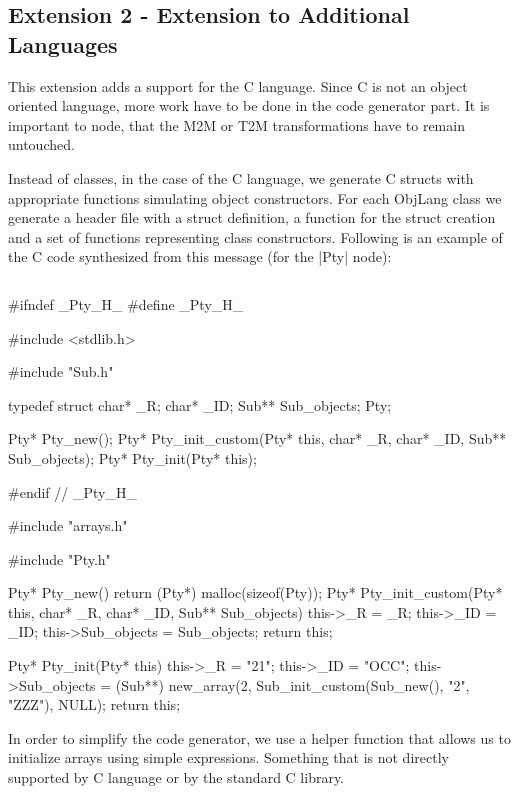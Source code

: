 \subsection{Extension 2 - Extension to Additional Languages}
\label{sec:Extension2}

This extension adds a support for the C language.
Since C is not an object oriented language, more work have to be done in the code generator part.
It is important to node, that the M2M or T2M transformations have to remain untouched.

Instead of classes, in the case of the C language, we generate C structs with appropriate functions simulating object constructors.
For each ObjLang class we generate a header file with a struct definition, a function for the struct creation and a set of functions representing class constructors.
Following is an example of the C code synthesized from this \FIXML message (for the \Scala|Pty| node):
%
\inputminted[fontsize=\fontsize{8}{8},linenos,numbersep=5pt,frame=lines,framesep=2mm]{xml}{listings/example-for-c-code.xml}
%
\begin{ccode}
#ifndef _Pty_H_
#define _Pty_H_

#include <stdlib.h>

#include "Sub.h"

typedef struct {
  char* _R;
  char* _ID;
  Sub** Sub_objects;
} Pty;

Pty* Pty_new();
Pty* Pty_init_custom(Pty* this, char* _R, char* _ID, Sub** Sub_objects);
Pty* Pty_init(Pty* this);

#endif // _Pty_H_	
\end{ccode}
%
\begin{ccode}
#include "arrays.h"

#include "Pty.h"

Pty* Pty_new() {
  return (Pty*) malloc(sizeof(Pty));
}
Pty* Pty_init_custom(Pty* this, char* _R, char* _ID, Sub** Sub_objects) {
  this->_R = _R;
  this->_ID = _ID;
  this->Sub_objects = Sub_objects;
  return this;
}

Pty* Pty_init(Pty* this) {
  this->_R = "21";
  this->_ID = "OCC";
  this->Sub_objects = (Sub**) new_array(2, Sub_init_custom(Sub_new(), "2", "ZZZ"), NULL);
  return this;
}
\end{ccode}

In order to simplify the code generator, we use a helper function  that allows us to initialize arrays using simple expressions.
Something that is not directly supported by C language or by the standard C library.

